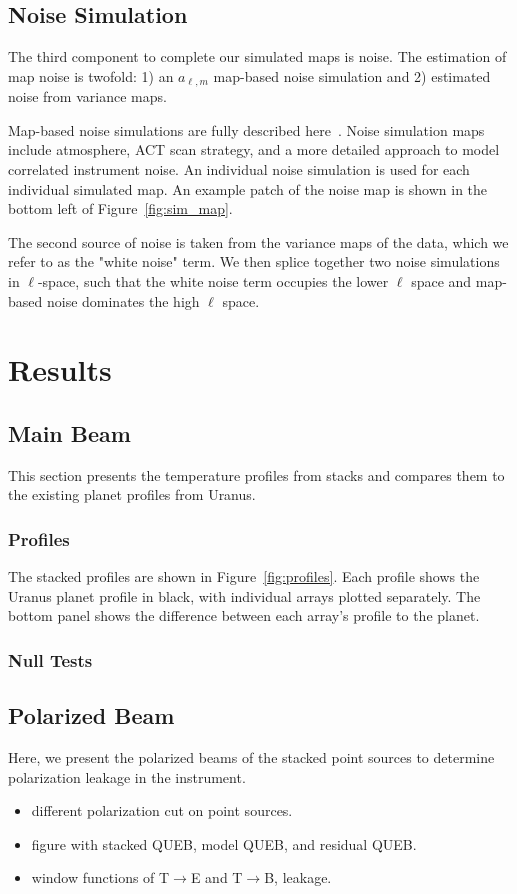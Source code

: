 \subsection{Noise Simulation}
\label{subsec:sim_noise}

The third component to complete our simulated maps is noise.  The estimation of map noise is twofold: 1) an $a_{\ell,m}$ map-based noise simulation and 2) estimated noise from variance maps.

Map-based noise simulations are fully described here~\cite{}.  Noise simulation maps include atmosphere, ACT scan strategy, and a more detailed approach to model correlated instrument noise.  An individual noise simulation is used for each individual simulated map.  An example patch of the noise map is shown in the bottom left of Figure~\ref{fig:sim_map}. 

The second source of noise is taken from the variance maps of the data, which we refer to as the "white noise" term.  We then splice together two noise simulations in $\ell$-space, such that the white noise term occupies the lower $\ell$ space and map-based noise dominates the high $\ell$ space.

\section{Results}
\label{sec:pol}

\subsection{Main Beam}
\label{subsec:mainbeam}
This section presents the temperature profiles from stacks and compares them to the existing planet profiles from Uranus. 

\subsubsection{Profiles}
\label{subsubsec:profiles}
The stacked profiles are shown in Figure~\ref{fig:profiles}.  Each profile shows the Uranus planet profile in black, with individual arrays plotted separately.  The bottom panel shows the difference between each array's profile to the planet.
\subsubsection{Null Tests}
\label{subsubsec:null_mainbeam}


\subsection{Polarized Beam}
\label{subsec:polbeam}
Here, we present the polarized beams of the stacked point sources to determine polarization leakage in the instrument. 
\begin{itemize}
    \item different polarization cut on point sources.
    \item figure with stacked QUEB, model QUEB, and residual QUEB.
    \item window functions of T$\xrightarrow[]{}$E and T$\xrightarrow[]{}$B, leakage.
\end{itemize}

